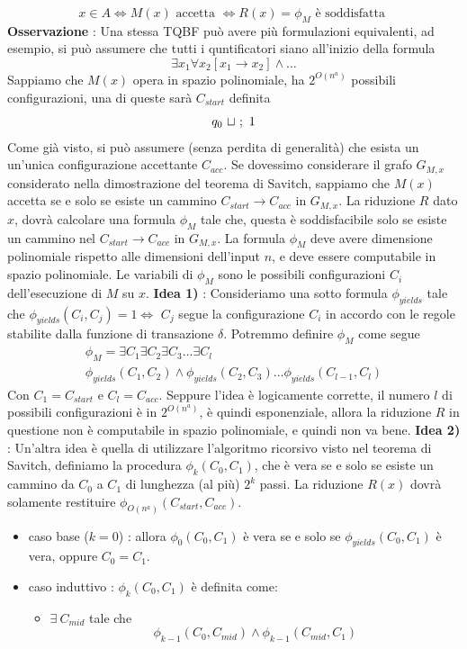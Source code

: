 \documentclass[10pt, letterpaper]{report}
\begin{document}
$$ x\in A \iff M(x)\text{ accetta }\iff R(x)=\phi_M \text{ è soddisfatta }$$
\textbf{Osservazione} : Una stessa TQBF può avere più formulazioni equivalenti, ad esempio, si può assumere che tutti i quntificatori siano all'inizio della formula 
$$ \exists x_1 \forall x_2 [x_1\rightarrow x_2]\land \dots$$
Sappiamo che $M(x)$ opera in spazio polinomiale, ha $2^{O(n^a)}$ possibili configurazioni, una di queste sarà $C_{start}$ definita $$ q_0 \ {\sqcup} \ ; \  1$$
Come già visto, si può assumere (senza perdita di generalità) che esista un un'unica configurazione accettante $C_{acc}$.\acc 
Se dovessimo considerare il grafo $G_{M,x}$ considerato nella dimostrazione del teorema di Savitch, sappiamo che $M(x)$ accetta se e solo se esiste un cammino $C_{start}\longrightarrow C_{acc}$ in $G_{M,x}$.\acc 
La riduzione $R$ dato $x$, dovrà calcolare una formula $\phi_M$ tale che, questa è soddisfacibile solo se esiste un cammino nel $C_{start}\longrightarrow C_{acc}$ in $G_{M,x}$. La formula $\phi_M$ deve avere dimensione polinomiale rispetto alle dimensioni dell'input $n$, e deve essere computabile in spazio polinomiale.\acc 
Le variabili di $\phi_M$ sono le possibili configurazioni $C_i$ dell'esecuzione di $M$ su $x$.\acc 
\textbf{Idea 1)} : Consideriamo una sotto formula $\phi_{yields}$ tale che  $\phi_{yields}(C_i,C_j)=1\iff$ $C_j$ segue la configurazione $C_i$ in accordo con le regole stabilite dalla funzione di transazione $\delta$. Potremmo definire $\phi_M$ come segue 
$$ \begin{matrix}
    \phi_M=\exists C_1\exists C_2\exists C_3 \dots \exists C_l\\ 
    \phi_{yields}(C_1,C_2)\land\phi_{yields}(C_2,C_3)\dots \phi_{yields}(C_{l-1},C_l)
\end{matrix}$$
Con $C_1=C_{start}$ e $C_l=C_{acc}$. Seppure l'idea è logicamente corrette, il numero $l$ di possibili configurazioni è in $2^{O(n^a)}$, è quindi esponenziale, allora la riduzione $R$ in questione non è computabile in spazio polinomiale, e quindi non va bene.\acc
\textbf{Idea 2)} : Un'altra idea è quella di utilizzare l'algoritmo ricorsivo visto nel teorema di Savitch, definiamo la procedura $\phi_k(C_0,C_1)$, che è vera se e solo se esiste un cammino da $C_0$ a $C_1$ di lunghezza (al più) $2^k$ passi. La riduzione $R(x)$ dovrà solamente restituire $\phi_{O(n^a)}(C_{start},C_{acc})$.\begin{itemize}
    \item caso base ($k=0$) : allora $\phi_0(C_0,C_1)$ è vera se e solo se $\phi_{yields}(C_0,C_1)$ è vera, oppure $C_0=C_1$. 
    \item caso induttivo : $\phi_k(C_0,C_1)$ è definita come:\begin{itemize}
        \item $\exists \ C_{mid}$ tale che $$\phi_{k-1}(C_0,C_{mid})\land \phi_{k-1}(C_{mid},C_1) $$ 
    \end{itemize}
\end{itemize}
\end{document}
